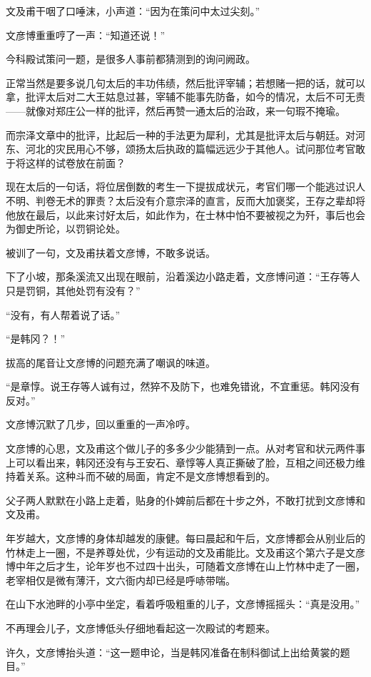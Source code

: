 文及甫干咽了口唾沫，小声道：“因为在策问中太过尖刻。”

文彦博重重哼了一声：“知道还说！”

今科殿试策问一题，是很多人事前都猜测到的询问阙政。

正常当然是要多说几句太后的丰功伟绩，然后批评宰辅；若想赌一把的话，就可以拿，批评太后对二大王姑息过甚，宰辅不能事先防备，如今的情况，太后不可无责——就像对郑庄公一样的批评，然后再赞一通太后的治政，来一句瑕不掩瑜。

而宗泽文章中的批评，比起后一种的手法更为犀利，尤其是批评太后与朝廷。对河东、河北的灾民用心不够，颂扬太后执政的篇幅远远少于其他人。试问那位考官敢于将这样的试卷放在前面？

现在太后的一句话，将位居倒数的考生一下提拔成状元，考官们哪一个能逃过识人不明、判卷无术的罪责？太后没有介意宗泽的直言，反而大加褒奖，王存之辈却将他放在最后，以此来讨好太后，如此作为，在士林中怕不要被视之为歼，事后也会为御史所论，以罚铜论处。

被训了一句，文及甫扶着文彦博，不敢多说话。

下了小坡，那条溪流又出现在眼前，沿着溪边小路走着，文彦博问道：“王存等人只是罚铜，其他处罚有没有？”

“没有，有人帮着说了话。”

“是韩冈？！”

拔高的尾音让文彦博的问题充满了嘲讽的味道。

“是章惇。说王存等人诚有过，然猝不及防下，也难免错讹，不宜重惩。韩冈没有反对。”

文彦博沉默了几步，回以重重的一声冷哼。

文彦博的心思，文及甫这个做儿子的多多少少能猜到一点。从对考官和状元两件事上可以看出来，韩冈还没有与王安石、章惇等人真正撕破了脸，互相之间还极力维持着关系。这种斗而不破的局面，肯定不是文彦博想看到的。

父子两人默默在小路上走着，贴身的仆婢前后都在十步之外，不敢打扰到文彦博和文及甫。

年岁越大，文彦博的身体却越发的康健。每曰晨起和午后，文彦博都会从别业后的竹林走上一圈，不是养尊处优，少有运动的文及甫能比。文及甫这个第六子是文彦博中年之后才生，论年岁也不过四十出头，可随着文彦博在山上竹林中走了一圈，老宰相仅是微有薄汗，文六衙内却已经是呼哧带喘。

在山下水池畔的小亭中坐定，看着呼吸粗重的儿子，文彦博摇摇头：“真是没用。”

不再理会儿子，文彦博低头仔细地看起这一次殿试的考题来。

许久，文彦博抬头道：“这一题申论，当是韩冈准备在制科御试上出给黄裳的题目。”

